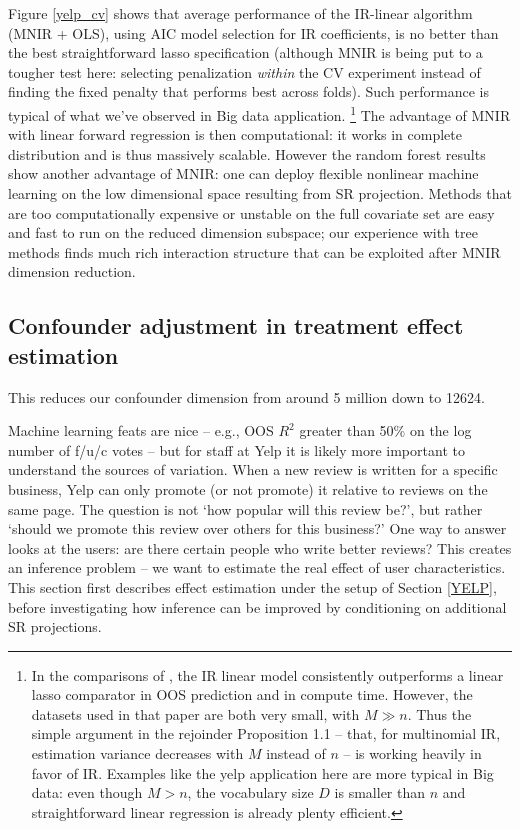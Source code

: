 \documentclass[12pt]{article}
\begin{document}
Figure \ref{yelp_cv} shows that average performance of the IR-linear algorithm
(MNIR + OLS), using AIC model selection for IR coefficients, is no better than
the best straightforward lasso specification (although MNIR is being put to a
tougher test here: selecting penalization {\it within} the CV experiment
instead of finding the fixed penalty that performs best across folds). Such
performance is  typical of what we've observed in Big data application.
\footnote{In the comparisons of \cite{taddy_multinomial_2013}, the IR linear
model consistently outperforms a linear lasso comparator in OOS prediction and
in compute time.  However, the datasets used in that paper are both very
small, with $M\gg n$.  Thus the simple argument in the rejoinder
\cite{taddy_rejoinder:_2013} Proposition 1.1 -- that, for multinomial IR,
estimation variance decreases with $M$ instead of $n$ -- is working heavily in
favor of IR. Examples like the yelp application here are more typical in Big
data: even though $M > n$, the vocabulary size $D$ is smaller than $n$ and
straightforward linear regression is already plenty efficient.}   The
advantage of MNIR with linear forward regression is then computational: it
works in complete distribution  and is thus massively scalable.  However the
random forest results show another advantage of MNIR: one can deploy flexible
nonlinear machine learning on the low dimensional space resulting from SR
projection. Methods that are too computationally expensive or unstable on the
full covariate set are easy and fast to run on the reduced dimension subspace;
our experience with tree methods finds much rich interaction structure that
can be exploited after MNIR dimension reduction.

\subsection{Confounder adjustment in treatment effect estimation}

This reduces our confounder dimension from around 5 million down to 12624.


Machine learning feats are nice -- e.g., OOS $R^2$ greater than 50\% on the
log number of f/u/c votes -- but for staff at Yelp it is likely more important
to understand the sources of variation.  When a new review is written for a
specific business, Yelp can only promote (or not promote) it relative to
reviews on the same page.  The question is not `how popular will this review
be?', but rather `should we promote this review over others for this
business?'  One way to answer looks at the users: are there certain people who
write better reviews?  This creates an inference problem -- we want to
estimate the real effect of user characteristics. This section first describes
effect estimation under the setup of Section \ref{YELP}, before investigating how
inference can be improved by conditioning on additional SR projections.
\end{document}

